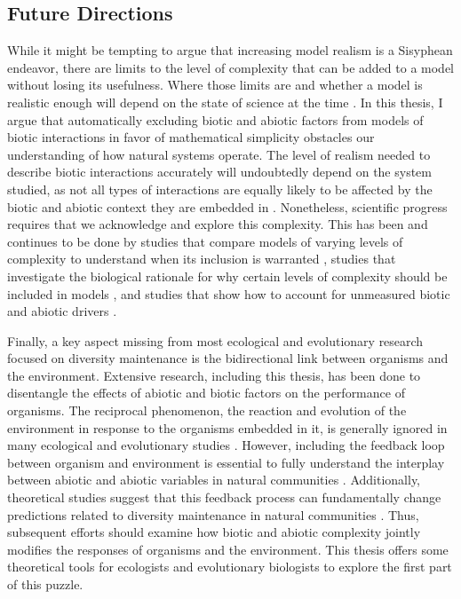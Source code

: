 \begin{refsection}


\section*{Future Directions}

While it might be tempting to argue that increasing model realism is a Sisyphean endeavor, there are limits to the level of complexity that can be added to a model without losing its usefulness. Where those limits are and whether a model is realistic enough will depend on the state of science at the time \citep{levins1993response}. In this thesis, I argue that automatically excluding biotic and abiotic factors from models of biotic interactions in favor of mathematical simplicity obstacles our understanding of how natural systems operate. The level of realism needed to describe biotic interactions accurately will undoubtedly depend on the system studied, as not all types of interactions are equally likely to be affected by the biotic and abiotic context they are embedded in \citep{chamberlain_how_2014}. Nonetheless, scientific progress requires that we acknowledge and explore this complexity. This has been and continues to be done by studies that compare models of varying levels of complexity to understand when its inclusion is warranted \citep{lai2020role,martyn2021identifying,bimler_accurate_2018,weiss2021disentangling}, studies that investigate the biological rationale for why certain levels of complexity should be included in models \citep{abrams1983arguments,abrams_nature_2000,letten_mechanistic_2019,stouffer2021hidden,aladwani2019addition}, and studies that show how to account for unmeasured biotic and abiotic drivers \citep{d2018translucent, song_towards_2020}.

Finally, a key aspect missing from most ecological and evolutionary research focused on diversity maintenance is the bidirectional link between organisms and the environment. Extensive research, including this thesis, has been done to disentangle the effects of abiotic and biotic factors on the performance of organisms. The reciprocal phenomenon, the reaction and evolution of the environment in response to the organisms embedded in it, is generally ignored in many ecological and evolutionary studies \citep{levins_dialectics_1980,laland1999evolutionary}. However, including the feedback loop between organism and environment is essential to fully understand the interplay between abiotic and abiotic variables in natural communities \citep{callaway2007positive,hastings2007ecosystem}. Additionally, theoretical studies suggest that this feedback process can fundamentally change predictions related to diversity maintenance in natural communities \citep{kylafis_niche_2011,kylafis2008ecological}. Thus, subsequent efforts should examine how biotic and abiotic complexity jointly modifies the responses of organisms and the environment. This thesis offers some theoretical tools for ecologists and evolutionary biologists to explore the first part of this puzzle.


\printbibliography
\end{refsection}
